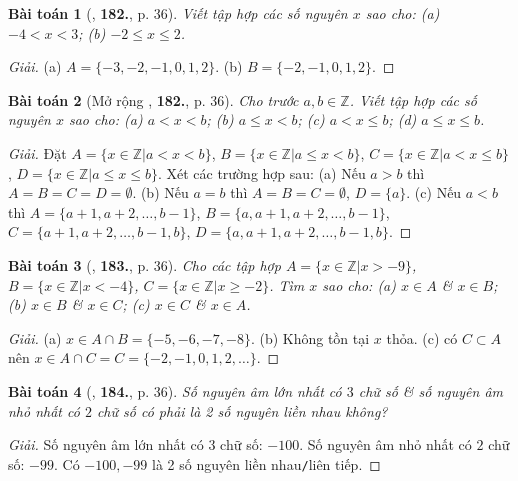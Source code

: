 \documentclass{article}
\numberwithin{equation}{section}
\newtheorem{baitoan}{Bài toán}
\begin{document}
\begin{baitoan}[\cite{Tuyen_Toan_6}, \textbf{182.}, p. 36]
	Viết tập hợp các số nguyên $x$ sao cho: (a) $-4 < x < 3$; (b) $-2\le x\le 2$.
\end{baitoan}

\begin{proof}[Giải]
	(a) $A = \{-3,-2,-1,0,1,2\}$. (b) $B = \{-2,-1,0,1,2\}$.
\end{proof}

\begin{baitoan}[Mở rộng \cite{Tuyen_Toan_6}, \textbf{182.}, p. 36]
	Cho trước $a,b\in\mathbb{Z}$. Viết tập hợp các số nguyên $x$ sao cho: (a) $a < x < b$; (b) $a\le x < b$; (c) $a < x\le b$; (d) $a\le x\le b$.
\end{baitoan}

\begin{proof}[Giải]
	Đặt $A = \{x\in\mathbb{Z}|a < x < b\}$, $B = \{x\in\mathbb{Z}|a\le x < b\}$, $C = \{x\in\mathbb{Z}|a < x\le b\}$, $D = \{x\in\mathbb{Z}|a\le x\le b\}$. Xét các trường hợp sau: (a) Nếu $a > b$ thì $A = B = C = D = \emptyset$. (b) Nếu $a = b$ thì $A = B = C = \emptyset$, $D = \{a\}$. (c) Nếu $a < b$ thì $A = \{a + 1,a + 2,\ldots,b - 1\}$, $B = \{a,a + 1,a + 2,\ldots,b - 1\}$, $C = \{a + 1,a + 2,\ldots,b - 1,b\}$, $D = \{a,a + 1,a + 2,\ldots,b - 1,b\}$.
\end{proof}

\begin{baitoan}[\cite{Tuyen_Toan_6}, \textbf{183.}, p. 36]
	Cho các tập hợp $A = \{x\in\mathbb{Z}|x > -9\}$, $B = \{x\in\mathbb{Z}|x < -4\}$, $C = \{x\in\mathbb{Z}|x\ge-2\}$. Tìm $x$ sao cho: (a) $x\in A$ \& $x\in B$; (b) $x\in B$ \& $x\in C$; (c) $x\in C$ \& $x\in A$.
\end{baitoan}

\begin{proof}[Giải]
	(a) $x\in A\cap B = \{-5,-6,-7,-8\}$. (b) Không tồn tại $x$ thỏa. (c) có $C \subset A$ nên $x\in A\cap C = C = \{-2,-1,0,1,2,\ldots\}$.
\end{proof}

\begin{baitoan}[\cite{Tuyen_Toan_6}, \textbf{184.}, p. 36]
	Số nguyên âm lớn nhất có $3$ chữ số \& số nguyên âm nhỏ nhất có $2$ chữ số có phải là 2 số nguyên liền nhau không?
\end{baitoan}

\begin{proof}[Giải]
	Số nguyên âm lớn nhất có $3$ chữ số: $-100$. Số nguyên âm nhỏ nhất có $2$ chữ số: $-99$. Có $-100,-99$ là 2 số nguyên liền nhau\texttt{/}liên tiếp.
\end{proof}
\end{document}
